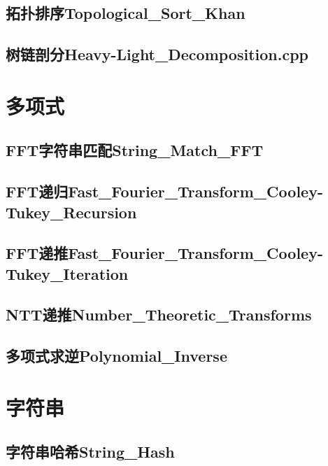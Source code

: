 \documentclass[10pt,a4paper]{article}
\begin{document}
\subsection{拓扑排序Topological\_Sort\_Khan}

\subsection{树链剖分Heavy-Light\_Decomposition.cpp}


\newpage
\section{多项式}
\subsection{FFT字符串匹配String\_Match\_FFT}

\subsection{FFT递归Fast\_Fourier\_Transform\_Cooley-Tukey\_Recursion}

\subsection{FFT递推Fast\_Fourier\_Transform\_Cooley-Tukey\_Iteration}

\subsection{NTT递推Number\_Theoretic\_Transforms}

\subsection{多项式求逆Polynomial\_Inverse}


\newpage
\section{字符串}
\subsection{字符串哈希String\_Hash}

\end{document}
